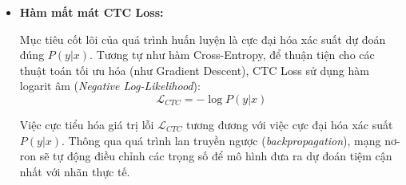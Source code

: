 \begin{itemize}
    \item \textbf{Hàm mất mát CTC Loss:}
    
    Mục tiêu cốt lõi của quá trình huấn luyện là cực đại hóa xác suất dự đoán đúng $P(y|x)$. Tương tự như hàm Cross-Entropy, để thuận tiện cho các thuật toán tối ưu hóa (như Gradient Descent), CTC Loss sử dụng hàm logarit âm (\textit{Negative Log-Likelihood}):
    $$\mathcal{L}_{CTC} = -\log P(y|x)$$
    
    Việc cực tiểu hóa giá trị lỗi $\mathcal{L}_{CTC}$ tương đương với việc cực đại hóa xác suất $P(y|x)$. Thông qua quá trình lan truyền ngược (\textit{backpropagation}), mạng nơ-ron sẽ tự động điều chỉnh các trọng số để mô hình đưa ra dự đoán tiệm cận nhất với nhãn thực tế.
\end{itemize}

